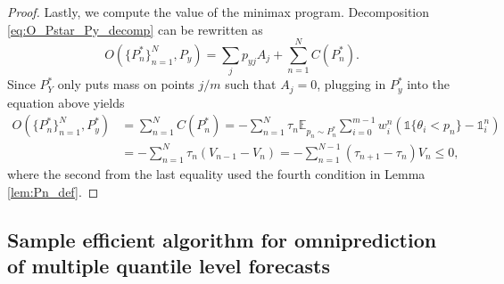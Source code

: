 \documentclass{article}
\newcommand{\one}{\mathds{1}}
\newcommand{\indi}[1]{\mathds{1}\{#1\}}
\newcommand{\E}{\mathbb{E}}
\begin{document}
\begin{proof}
Lastly, we compute the value of the minimax program. Decomposition \eqref{eq:O_Pstar_Py_decomp} can be rewritten as 
\[
O(\{P_n^*\}_{n=1}^N, P_y) = \sum_{j} p_{yj} A_j + \sum_{n=1}^N C(P_n^*).
\]
Since $P_Y^*$ only puts mass on points $j/m$ such that $A_j = 0$, plugging in $P_y^*$ into the equation above yields
\begin{align*}
O(\{P_n^*\}_{n=1}^N, P_y^*) 
&= \sum_{n=1}^N C(P_n^*) = -\sum_{n=1}^N \tau_n \E_{p_n \sim P_n^*} \sum_{i=0}^{m-1} w_i^n (\indi{\theta_i < p_n} - \one_i^n) \\
&  = -\sum_{n=1}^N \tau_n (V_{n-1} - V_n) = -\sum_{n=1}^{N-1}(\tau_{n+1}-\tau_n)V_n \leq 0,
\end{align*}
where the second from the last equality used the fourth condition in Lemma \ref{lem:Pn_def}.
\end{proof}


\subsection{Sample efficient algorithm for omniprediction of multiple quantile level forecasts}\label{subsec:omni_multi_q_online}
\end{document}
